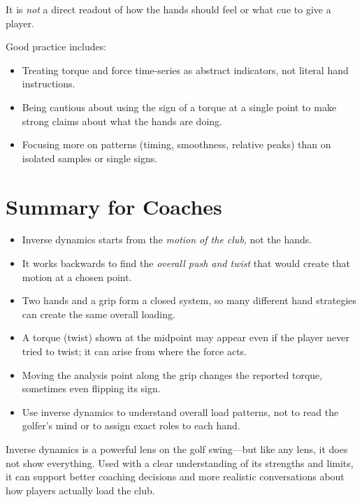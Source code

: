 \documentclass[12pt]{article}
\begin{document}
It is \emph{not} a direct readout of how the hands should feel or what cue to give a player.

Good practice includes:
\begin{itemize}
    \item Treating torque and force time-series as abstract indicators, not literal hand instructions.
    \item Being cautious about using the sign of a torque at a single point to make strong claims about what the hands are doing.
    \item Focusing more on patterns (timing, smoothness, relative peaks) than on isolated samples or single signs.
\end{itemize}

\section{Summary for Coaches}

\begin{itemize}
    \item Inverse dynamics starts from the \emph{motion of the club}, not the hands.
    \item It works backwards to find the \emph{overall push and twist} that would create that motion at a chosen point.
    \item Two hands and a grip form a closed system, so many different hand strategies can create the same overall loading.
    \item A torque (twist) shown at the midpoint may appear even if the player never tried to twist; it can arise from where the force acts.
    \item Moving the analysis point along the grip changes the reported torque, sometimes even flipping its sign.
    \item Use inverse dynamics to understand overall load patterns, not to read the golfer’s mind or to assign exact roles to each hand.
\end{itemize}

Inverse dynamics is a powerful lens on the golf swing—but like any lens, it does not show everything.  
Used with a clear understanding of its strengths and limits, it can support better coaching decisions and more realistic conversations about how players actually load the club.
\end{document}
